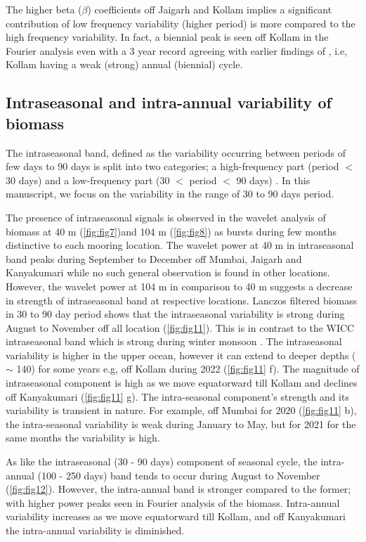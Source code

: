 \documentclass{article}
\begin{document}
	The higher beta ($\beta$) coefficients off Jaigarh and Kollam implies a significant contribution of low frequency variability (higher period) is more compared to the high frequency variability. In fact, a biennial peak is seen off Kollam in the Fourier analysis even with a 3 year record agreeing with earlier findings of \citep{aparna2022seasonal}, i.e, Kollam having a weak (strong) annual (biennial) cycle. 
	
	\subsection{Intraseasonal and intra-annual variability of biomass}
    The intraseasonal band, defined as the variability occurring between periods of few days to 90 days is split into two categories; a high-frequency part (period $<$ 30 days) and a low-frequency part (30 $<$ period $<$ 90 days) \citep{amol2014observed, chaudhuri2020observed}. In this manuscript, we focus on the variability in the range of 30 to 90 days period. 
    
    The presence of intraseasonal signals is observed in the wavelet analysis of biomass at 40 m (\cref{fig:fig7})and 104 m (\cref{fig:fig8}) as bursts during few months distinctive to each mooring location. The wavelet power at 40 m in intraseasonal band peaks during September to December off Mumbai, Jaigarh and Kanyakumari while no such general observation is found in other locations. However, the wavelet power at 104 m in comparison to 40 m suggests a decrease in strength of  intraseasonal band at respective locations. Lanczos filtered biomass in 30 to 90 day period shows that the intraseasonal variability is strong during August to November off all location (\cref{fig:fig11}). This is in contrast to the WICC intraseasonal band which is strong during winter monsoon \citep{amol2014observed, chaudhuri2020observed}. The intraseasonal variability is higher in the upper ocean, however it can extend to deeper depths ($\sim$ 140) for some years e.g, off Kollam during 2022 (\cref{fig:fig11} f). The magnitude of intraseasonal component is high as we move equatorward till Kollam and declines off Kanyakumari (\cref{fig:fig11} g). The intra-seasonal component's strength and its variability is transient in nature. For example, off Mumbai for 2020 (\cref{fig:fig11} b), the intra-seasonal variability is weak during January to May, but for 2021 for the same months the variability is high.
    
    As like the intraseasonal (30 - 90 days) component of seasonal cycle, the intra-annual (100 - 250 days) band tends to occur during August to November (\cref{fig:fig12}). However, the intra-annual band is stronger compared to the former; with higher power peaks seen in Fourier analysis of the biomass. Intra-annual variability increases as we move equatorward till Kollam, and off Kanyakumari the intra-annual variability is diminished. 
    
\end{document}

